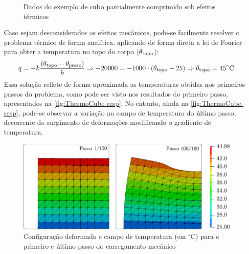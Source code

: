 \documentclass[Tese.tex]{subfiles}
\begin{document}
\begin{figure}[!htb]
	\centering
	\caption{Dados do exemplo de cubo parcialmente comprimido sob efeitos térmicos}
	\label{fig:ThermoCube}
	{\small
		\noindent{}
	}	
\end{figure}

Caso sejam desconsiderados os efeitos mecânicos, pode-se facilmente resolver o problema térmico de forma analítica, aplicando de forma direta a lei de Fourier para obter a temperatura no topo do corpo ($\theta_\text{topo}$):
\begin{equation}\label{eq:solucao-problem-term-1}
\bar{q} = -k\dfrac{(\theta_\text{topo}-\theta_\text{presc})}{h} \Rightarrow -20000 = -1000\cdot(\theta_\text{topo}-25) \Rightarrow \theta_\text{topo} = 45^{\circ}\text{C}.
\end{equation}
Essa solução reflete de forma aproximada as temperaturas obtidas nos primeiros passos do problema, como pode ser visto nos resultados do primeiro passo, apresentados na \autoref{fig:ThermoCube-resp}. No entanto, ainda na \autoref{fig:ThermoCube-resp}, pode-se observar a variação no campo de temperatura do último passo, decorrente do surgimento de deformações modificando o gradiente de temperatura.

\begin{figure}[!htb]
	\centering
	\caption{Configuração deformada e campo de temperatura (em $^{\circ}$C) para o primeiro e último passo do carregamento mecânico}
	\label{fig:ThermoCube-resp}
	\includegraphics[scale=0.45]{Figuras/ThermoCube/ThermoCube.png}
\end{figure}
\end{document}
